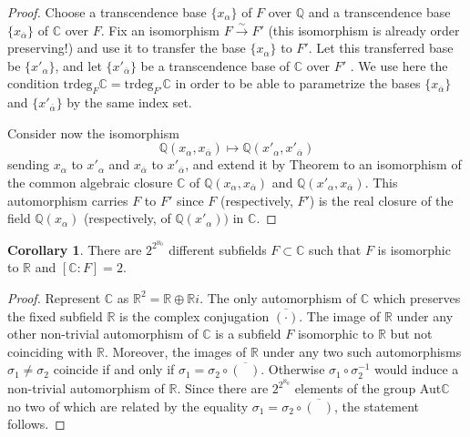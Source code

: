 \documentclass[11pt]{article}
\theoremstyle{plain}
\theoremstyle{definition}
\newtheorem{corollary}[theorem]{Corollary}
\theoremstyle{remark}
\begin{document}
\begin{proof}
     Choose a transcendence base $\{x_{\alpha}\}$ of $F$ over $\mathbb{Q}$ and a transcendence base $\{x_{\overline{\alpha}}\}$ of $\mathbb{C}$ over $F$. Fix an isomorphism $F \overset{\sim}{\to} F'$ (this isomorphism is already order preserving!) and use it to transfer the base $\{x_{\alpha}\}$ to $F'$. Let this transferred base be $\{x'_{\alpha}\}$, and let $\{x'_{\overline{\alpha}}\}$ be a transcendence base of $\mathbb{C}$ over $F'$ . We use here the condition $\textrm{trdeg}_F \mathbb{C} = \textrm{trdeg}_{F'} \mathbb{C}$ in order to be able to parametrize the bases $\{x_{\overline{\alpha}}\}$ and $\{x'_{\overline{\alpha}}\}$ by the same index set.
    \par
    Consider now the isomorphism
    $$
        \mathbb{Q}(x_\alpha, x_{\overline{\alpha}}) \mapsto \mathbb{Q}(x'_\alpha, x'_{\overline{\alpha}})
    $$
    sending $x_\alpha$ to $x'_\alpha$ and $x_{\overline{\alpha}}$ to $ x'_{\overline{\alpha}}$, and extend it by Theorem \cite[Ch.V, Thm.~3.8]{Hungerford} to an isomorphism of the common algebraic closure $\mathbb{C}$ of $\mathbb{Q}(x_\alpha, x_{\overline{\alpha}})$ and $\mathbb{Q}(x'_\alpha, x_{\overline{\alpha}})$. This automorphism carries $F$ to $F'$ since $F$ (respectively, $F'$) is the real closure of the field $\mathbb{Q}(x_\alpha)$ (respectively, of $\mathbb{Q}(x'_\alpha))$ in $\mathbb{C}$.
\end{proof}

\begin{corollary}
        There are $2^{2^{\aleph_0}}$ different subfields $F\subset \mathbb{C}$ such that $F$ is isomorphic to $\mathbb{R}$ and $[\mathbb{C}: F ] = 2$.
\end{corollary}
\begin{proof}
        Represent $\mathbb{C}$ as $\mathbb{R}^2 = \mathbb{R} \oplus \mathbb{R}i$. The only automorphism of $\mathbb{C}$ which preserves the fixed subfield $\mathbb{R}$ is the complex conjugation $\overline{(\cdot)}$. The image of $\mathbb{R}$ under any other non-trivial automorphism of $\mathbb{C}$ is a subfield $F$ isomorphic to $\mathbb{R}$ but not coinciding with $\mathbb{R}$. Moreover, the images of $\mathbb{R}$ under any two such automorphisms $\sigma_1 \neq \sigma_2$ coincide if and only if $\sigma_1 = \sigma_2 \circ \overline{(\:\:\:)}.$ Otherwise $\sigma_1 \circ \sigma^{-1}_2$ would induce a non-trivial automorphism of $\mathbb{R}$. Since there are $2^{2^{\aleph_0}}$ elements of the group Aut$\mathbb{C}$ no two of which are related by the equality $\sigma_1 = \sigma_2 \circ \overline{(\:\:\:)}$,  the statement follows.
    \end{proof}
\end{document}
